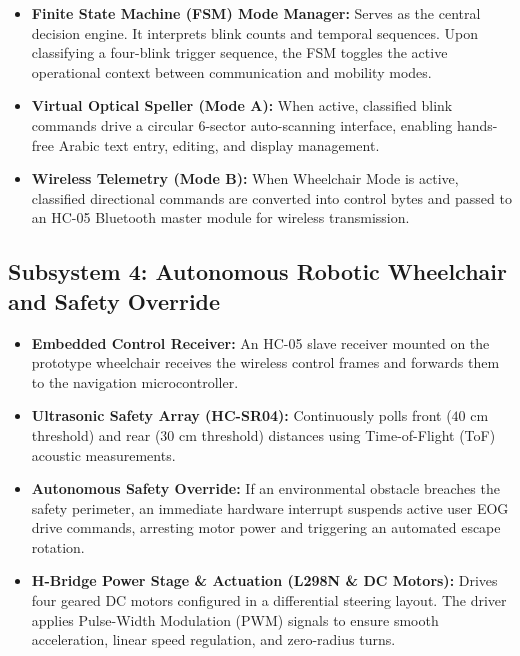 \begin{itemize}
    \item \textbf{Finite State Machine (FSM) Mode Manager:} Serves as the central decision engine. It interprets blink counts and temporal sequences. Upon classifying a four-blink trigger sequence, the FSM toggles the active operational context between communication and mobility modes.
    \item \textbf{Virtual Optical Speller (Mode A):} When active, classified blink commands drive a circular 6-sector auto-scanning interface, enabling hands-free Arabic text entry, editing, and display management.
    \item \textbf{Wireless Telemetry (Mode B):} When Wheelchair Mode is active, classified directional commands are converted into control bytes and passed to an HC-05 Bluetooth master module for wireless transmission.
\end{itemize}

\subsection{Subsystem 4: Autonomous Robotic Wheelchair and Safety Override}
\label{subsec:subsystem4_wheelchair_safety}
\label{subsec:smart_wheelchair_control}

\begin{itemize}
    \item \textbf{Embedded Control Receiver:} An HC-05 slave receiver mounted on the prototype wheelchair receives the wireless control frames and forwards them to the navigation microcontroller.
    \item \textbf{Ultrasonic Safety Array (HC-SR04):} Continuously polls front ($40\text{ cm}$ threshold) and rear ($30\text{ cm}$ threshold) distances using Time-of-Flight (ToF) acoustic measurements.
    \item \textbf{Autonomous Safety Override:} If an environmental obstacle breaches the safety perimeter, an immediate hardware interrupt suspends active user EOG drive commands, arresting motor power and triggering an automated escape rotation.
    \item \textbf{H-Bridge Power Stage \& Actuation (L298N \& DC Motors):} Drives four geared DC motors configured in a differential steering layout. The driver applies Pulse-Width Modulation (PWM) signals to ensure smooth acceleration, linear speed regulation, and zero-radius turns.
\end{itemize}
